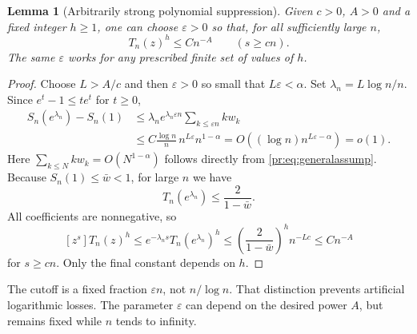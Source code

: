 \documentclass[11pt,a4paper]{article}
\newtheorem{lemma}[lemma]{Lemma}
\theoremstyle{definition}\newaliascnt{definition}{theorem}
\theoremstyle{remark}\newaliascnt{remark}{theorem}
\newcommand{\prcoef}[2]{[#1^{#2}]}
\begin{document}
\begin{lemma}[Arbitrarily strong polynomial suppression]\label{pr:lem:small}
Given $c>0$, $A>0$ and a fixed integer $h\ge1$, one can choose
$\varepsilon>0$ so that, for all sufficiently large $n$,
\begin{equation}
 \prcoef zs T_n(z)^h\le C n^{-A}\qquad(s\ge cn).
 \label{pr:eq:smallsuppress}
\end{equation}
The same $\varepsilon$ works for any prescribed finite set of values of
$h$.
\end{lemma}
\begin{proof}
Choose $L>A/c$ and then $\varepsilon>0$ so small that $L\varepsilon<\alpha$.
Set $\lambda_n=L\log n/n$. Since $e^t-1\le te^t$ for $t\ge0$,
\begin{align*}
 S_n(e^{\lambda_n})-S_n(1)
 &\le\lambda_n e^{\lambda_n\varepsilon n}
        \sum_{k\le\varepsilon n}k w_k\\
 &\le C\frac{\log n}{n}\,n^{L\varepsilon}
                  n^{1-\alpha}
 =O\!\left((\log n)n^{L\varepsilon-\alpha}\right)=o(1).
\end{align*}
Here $\sum_{k\le N}k w_k=O(N^{1-\alpha})$ follows directly from
\eqref{pr:eq:generalassump}. Because $S_n(1)\le\bar w<1$, for large $n$ we
have
\[
 T_n(e^{\lambda_n})\le\frac{2}{1-\bar w}.
\]
All coefficients are nonnegative, so
\[
 \prcoef zs T_n(z)^h
 \le e^{-\lambda_ns}T_n(e^{\lambda_n})^h
 \le \left(\frac{2}{1-\bar w}\right)^h n^{-Lc}
 \le Cn^{-A}
\]
for $s\ge cn$. Only the final constant depends on $h$.
\end{proof}

The cutoff is a fixed fraction $\varepsilon n$, not $n/\log n$. That
distinction prevents artificial logarithmic losses. The parameter
$\varepsilon$ can depend on the desired power $A$, but remains fixed while
$n$ tends to infinity.
\end{document}
